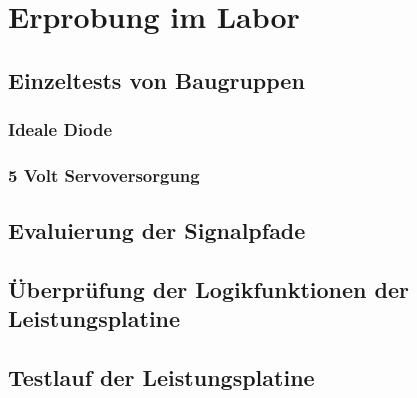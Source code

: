 \chapter{Erprobung im Labor}\label{cha:Erprobung im Labor}

\section{Einzeltests von Baugruppen}

\subsection{Ideale Diode}

\subsection{5 Volt Servoversorgung}

\section{Evaluierung der Signalpfade}

\section{Überprüfung der Logikfunktionen der Leistungsplatine}

\section{Testlauf der Leistungsplatine}